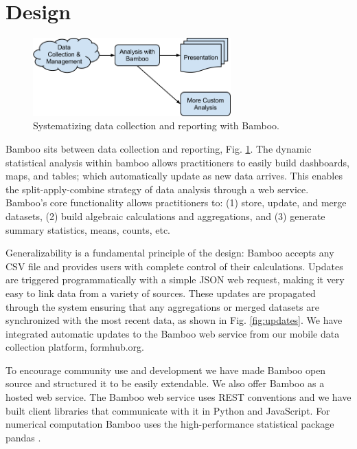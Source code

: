 \documentclass{acm_proc_article-sp}
\begin{document}
\section{Design}

\begin{figure}
\centering
\includegraphics[width=3in]{figures/bamboo_flow}
\caption{Systematizing data collection and reporting with Bamboo.}
\label{fig:flow}
\end{figure}

Bamboo sits between data collection and reporting, Fig. \ref{fig:flow}. The
dynamic statistical analysis within bamboo allows practitioners to easily build
dashboards, maps, and tables; which automatically update as new data
arrives.  This enables the split-apply-combine strategy of data analysis
\cite{wickham} through a web service.  
Bamboo's core functionality allows
practitioners to: (1) store, update, and merge datasets, (2) build algebraic calculations and aggregations, and (3) generate summary statistics, means, counts, etc.

Generalizability is a fundamental principle of the design: Bamboo accepts any
CSV file and provides users with complete control of their calculations.
Updates are triggered programmatically with a simple JSON web request, making it
very easy to link data from a variety of sources.
These updates are propagated through the system ensuring that any aggregations or merged datasets are synchronized with the most recent data, as shown in Fig. \ref{fig:updates}.  
We have integrated automatic updates to the Bamboo web service from our mobile data collection platform, formhub.org.

To encourage community use and development we have made Bamboo open source and structured it to be easily extendable.  We also offer Bamboo as a hosted web service.  The Bamboo web service uses REST conventions and we have built client libraries that communicate with it in Python and JavaScript.  For numerical computation Bamboo uses the high-performance statistical package pandas \cite{mckinney}.
\end{document}
